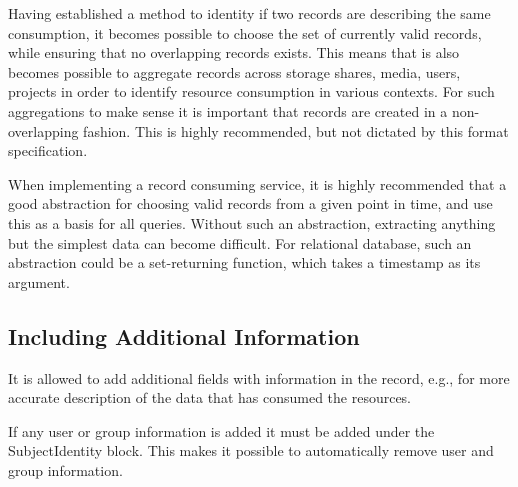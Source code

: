 Having established a method to identity if two records are describing the same
consumption, it becomes possible to choose the set of currently valid records,
while ensuring that no overlapping records exists. This means that is also
becomes possible to aggregate records across storage shares, media, users,
projects in order to identify resource consumption in various contexts. For
such aggregations to make sense it is important that records are created in
a non-overlapping fashion. This is highly recommended, but not dictated by
this format specification.

When implementing a record consuming service, it is highly recommended that a
good abstraction for choosing valid records from a given point in time, and use
this as a basis for all queries. Without such an abstraction, extracting
anything but the simplest data can become difficult. For relational database,
such an abstraction could be a set-returning function, which takes a timestamp
as its argument.


\subsection{Including Additional Information}

It is allowed to add additional fields with information in the record, e.g.,
for more accurate description of the data that has consumed the resources.

If any user or group information is added it must be added under the
SubjectIdentity block. This makes it possible to automatically remove user
and group information.

